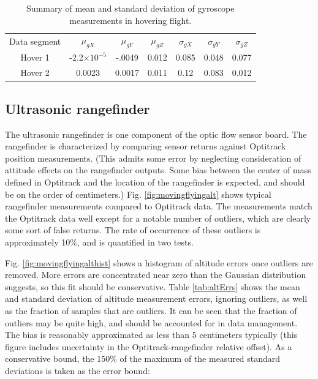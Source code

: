 \documentclass{article}
\begin{document}
\begin{table}[tb!]
\centering
\begin{tabular}{c|c|c|c|c|c|c}
Data segment & $\mu_{gX}$ & $\mu_{gY}$ & $\mu_{gZ}$ & $\sigma_{gX}$ & $\sigma_{gY}$ & $\sigma_{gZ}$\\
Hover 1 & -2.2$\times 10^{-5}$ & -.0049 & 0.012 & 0.085 & 0.048 & 0.077\\
Hover 2 & 0.0023 & 0.0017 & 0.011 & 0.12 & 0.083 & 0.012 \\
\end{tabular}
\caption{Summary of mean and standard deviation of gyroscope measurements in hovering flight.}
\label{tab:gyro_hover}
\end{table}

\subsection{Ultrasonic rangefinder}

The ultrasonic rangefinder is one component of the optic flow sensor board. The rangefinder is characterized by comparing sensor returns against Optitrack position measurements. (This admits some error by neglecting consideration of attitude effects on the rangefinder outputs. Some bias between the center of mass defined in Optitrack and the location of the rangefinder is expected, and should be on the order of centimeters.) Fig. \ref{fig:movingflyingalt} shows typical rangefinder measurements compared to Optitrack data. The measurements match the Optitrack data well except for a notable number of outliers, which are clearly some sort of false returns. The rate of occurrence of these outliers is approximately 10\%, and is quantified in two tests.

Fig. \ref{fig:movingflyingalthist} shows a histogram of altitude errors once outliers are removed. More errors are concentrated near zero than the Gaussian distribution suggests, so this fit should be conservative. Table \ref{tab:altErrs} shows the mean and standard deviation of altitude measurement errors, ignoring outliers, as well as the fraction of samples that are outliers. It can be seen that the fraction of outliers may be quite high, and should be accounted for in data management. The bias is reasonably approximated as less than 5 centimeters typically (this figure includes uncertainty in the Optitrack-rangefinder relative offset). As a conservative bound, the 150\% of the maximum of the measured standard deviations is taken as the error bound:
\end{document}
